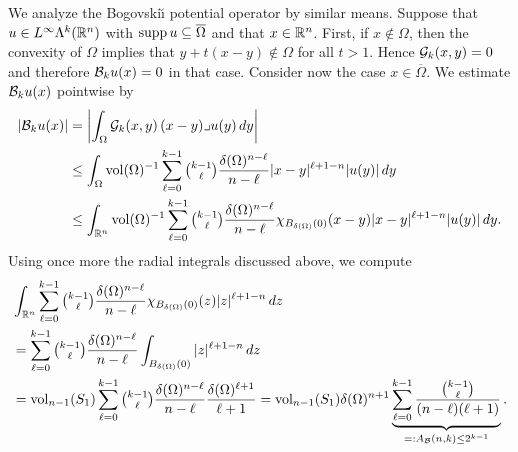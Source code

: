 \documentclass[10pt,a4paper]{article}
\begin{document}
We analyze the Bogovski\u{\i} potential operator by similar means. 
Suppose that $u \in L^{\infty}\Lambda^{k}({\mathbb R}^{n})$ with $\operatorname{supp} u \subseteq \overline\Omega$ and that $x \in {\mathbb R}^{n}$.
First, if $x \notin \Omega$, then the convexity of $\Omega$ implies that $y + t( x - y ) \notin \Omega$ for all $t > 1$. Hence ${\mathcal G}_{k}(x,y) = 0$ and therefore ${\mathcal B}_{k} u(x) = 0$ in that case.
Consider now the case $x \in \overline\Omega$. 
We estimate ${\mathcal B}_{k} u(x)$ pointwise by 
\begin{align*}
    \left| {\mathcal B}_{k} u(x) \right|
    &=
    \left| 
        \int_{\Omega} {\mathcal G}_{k}(x,y) \,(x-y)\lrcorner u(y)\,dy
    \right| 
    \\&\leq 
    \int_{\Omega} \operatorname{vol}(\Omega)^{-1} \sum_{\ell=0}^{k-1}\tbinom{k-1}{\ell} \frac{ {\delta}(\Omega)^{n-\ell} }{n-\ell} |x-y|^{\ell+1-n} |u(y)| \,dy
    \\&\leq 
    \int_{{\mathbb R}^{n}} \operatorname{vol}(\Omega)^{-1} \sum_{\ell=0}^{k-1}\tbinom{k-1}{\ell} \frac{ {\delta}(\Omega)^{n-\ell} }{n-\ell} \chi_{B_{{\delta}(\Omega)}(0)}(x-y) |x-y|^{\ell+1-n} |u(y)| \,dy
    .
\end{align*}
Using once more the radial integrals discussed above, we compute 
\begin{align*}
    &
    \int_{{\mathbb R}^{n}} \sum_{\ell=0}^{k-1} \tbinom{k-1}{\ell} \frac{ {\delta}(\Omega)^{n-\ell} }{n-\ell} \chi_{B_{{\delta}(\Omega)}(0)}(z) |z|^{\ell+1-n} \,dz
    \\&
    =
    \sum_{\ell=0}^{k-1} \tbinom{k-1}{\ell} \frac{ {\delta}(\Omega)^{n-\ell} }{n-\ell} \int_{B_{{\delta}(\Omega)}(0)} |z|^{\ell+1-n} \,dz
    \\&
    =
    \operatorname{vol}_{n-1}(S_1) \sum_{\ell=0}^{k-1} \tbinom{k-1}{\ell} \frac{ {\delta}(\Omega)^{n-\ell} }{n-\ell} \frac{{\delta}(\Omega)^{\ell+1}}{\ell+1}
    =
    \operatorname{vol}_{n-1}(S_1) {\delta}(\Omega)^{n+1} \underbrace{ \sum_{\ell=0}^{k-1} \frac{ \tbinom{k-1}{\ell} }{ (n-\ell)(\ell+1) } }_{ =: A_{{\mathcal B}}(n,k) \leq 2^{k-1}}
    \label{equation:A_Bogov}
    .
\end{align*}
\end{document}
